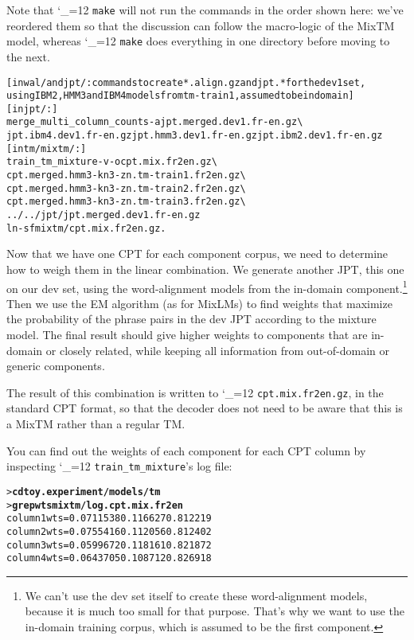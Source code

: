 \documentclass[11pt,letterpaper]{article}
\newcommand{\bs}{\textbackslash{}}
\def\code{\begingroup\catcode`\_=12 \codex}
\newcommand{\codex}[1]{\texttt{#1}\endgroup}
\begin{document}
Note that \code{make} will not run the commands in the order shown here: we've
reordered them so that the discussion can follow the macro-logic of the MixTM
model, whereas \code{make} does everything in one directory before moving
to the next.

\begin{small}
\begin{alltt}
   [in wal/ and jpt/: commands to create *.align.gz and jpt.* for the dev1 set,
    using IBM2, HMM3 and IBM4 models from tm-train1, assumed to be in domain]
   [in jpt/:]
   merge_multi_column_counts -a jpt.merged.dev1.fr-en.gz \bs
      jpt.ibm4.dev1.fr-en.gz jpt.hmm3.dev1.fr-en.gz jpt.ibm2.dev1.fr-en.gz
   [in tm/mixtm/:]
   train_tm_mixture -v -o cpt.mix.fr2en.gz \bs
      cpt.merged.hmm3-kn3-zn.tm-train1.fr2en.gz \bs
      cpt.merged.hmm3-kn3-zn.tm-train2.fr2en.gz \bs
      cpt.merged.hmm3-kn3-zn.tm-train3.fr2en.gz \bs
      ../../jpt/jpt.merged.dev1.fr-en.gz
   ln -sf mixtm/cpt.mix.fr2en.gz .
\end{alltt}
\end{small}

Now that we have one CPT for each component corpus, we need to determine how to
weigh them in the linear combination.  We generate another JPT, this one on our
dev set, using the word-alignment models from the in-domain
component.\footnote{We can't use the dev set itself to create these
word-alignment models, because it is much too small for that purpose.  That's
why we want to use the in-domain training corpus, which is assumed to be the
first component.}  Then we use the EM
algorithm (as for MixLMs) to find weights that maximize the probability of the
phrase pairs in the dev JPT according to the mixture model.  The final result
should give higher weights to components that are in-domain or closely related,
while keeping all information from out-of-domain or generic components.

The result of this combination is written to \code{cpt.mix.fr2en.gz}, in
the standard CPT format, so that the decoder does not need to be aware that
this is a MixTM rather than a regular TM.

You can find out the weights of each component for each CPT column by
inspecting \code{train_tm_mixture}'s log file:
\begin{small}
\begin{alltt}
   > \textbf{cd toy.experiment/models/tm}
   > \textbf{grep wts mixtm/log.cpt.mix.fr2en}
   column 1 wts = 0.0711538 0.116627 0.812219
   column 2 wts = 0.0755416 0.112056 0.812402
   column 3 wts = 0.0599672 0.118161 0.821872
   column 4 wts = 0.0643705 0.108712 0.826918
\end{alltt}
\end{small}
\end{document}
